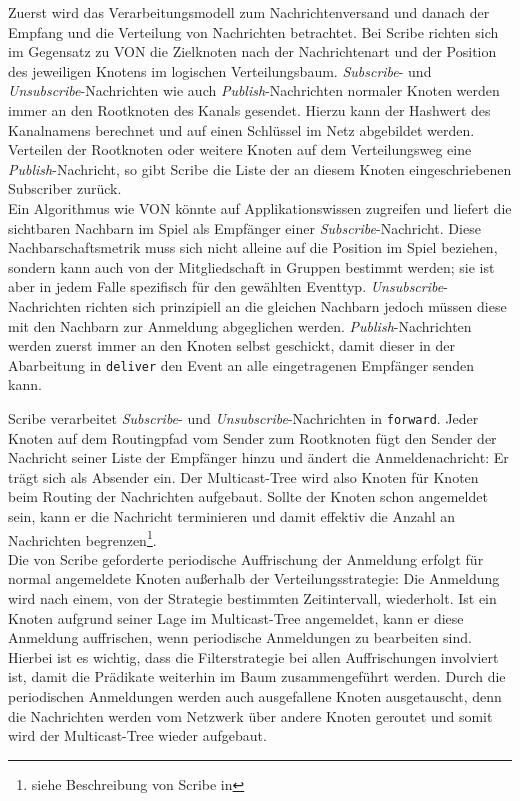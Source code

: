 Zuerst wird das Verarbeitungsmodell zum Nachrichtenversand und danach der Empfang und die Verteilung von Nachrichten betrachtet. Bei Scribe richten sich im Gegensatz zu VON die Zielknoten nach der Nachrichtenart und der Position des jeweiligen Knotens im logischen Verteilungsbaum. \emph{Subscribe}- und \emph{Unsubscribe}-Nachrichten wie auch \emph{Publish}-Nachrichten normaler Knoten werden immer an den Rootknoten des Kanals gesendet. Hierzu kann der Hashwert des Kanalnamens berechnet und auf einen Schlüssel im Netz abgebildet werden. Verteilen der Rootknoten oder weitere Knoten auf dem Verteilungsweg eine \emph{Publish}-Nachricht, so gibt Scribe die Liste der an diesem Knoten eingeschriebenen Subscriber zurück.\\
Ein Algorithmus wie VON könnte auf Applikationswissen zugreifen und liefert die sichtbaren Nachbarn im Spiel als Empfänger einer \emph{Subscribe}-Nachricht. Diese Nachbarschaftsmetrik muss sich nicht alleine auf die Position im Spiel beziehen, sondern kann auch von der Mitgliedschaft in Gruppen bestimmt werden; sie ist aber in jedem Falle spezifisch für den gewählten Eventtyp. \emph{Unsubscribe}-Nachrichten richten sich prinzipiell an die gleichen Nachbarn jedoch müssen diese mit den Nachbarn zur Anmeldung abgeglichen werden. \emph{Publish}-Nachrichten werden zuerst immer an den Knoten selbst geschickt, damit dieser in der Abarbeitung in \texttt{deliver} den Event an alle eingetragenen Empfänger senden kann.

Scribe verarbeitet \emph{Subscribe}- und \emph{Unsubscribe}-Nachrichten in \texttt{forward}. Jeder Knoten auf dem Routingpfad vom Sender zum Rootknoten fügt den Sender der Nachricht seiner Liste der Empfänger hinzu und ändert die Anmeldenachricht: Er trägt sich als Absender ein. Der Multicast-Tree wird also Knoten für Knoten beim Routing der Nachrichten aufgebaut. Sollte der Knoten schon angemeldet sein, kann er die Nachricht terminieren und damit effektiv die Anzahl an Nachrichten begrenzen\footnote{siehe Beschreibung von Scribe in }.\\
Die von Scribe geforderte periodische Auffrischung der Anmeldung erfolgt für normal angemeldete Knoten außerhalb der Verteilungsstrategie: Die Anmeldung wird nach einem, von der Strategie bestimmten Zeitintervall, wiederholt. Ist ein Knoten aufgrund seiner Lage im Multicast-Tree angemeldet, kann er diese Anmeldung auffrischen, wenn periodische Anmeldungen zu bearbeiten sind. Hierbei ist es wichtig, dass die Filterstrategie bei allen Auffrischungen involviert ist, damit die Prädikate weiterhin im Baum zusammengeführt werden. Durch die periodischen Anmeldungen werden auch ausgefallene Knoten ausgetauscht, denn die Nachrichten werden vom Netzwerk über andere Knoten geroutet und somit wird der Multicast-Tree wieder aufgebaut.

